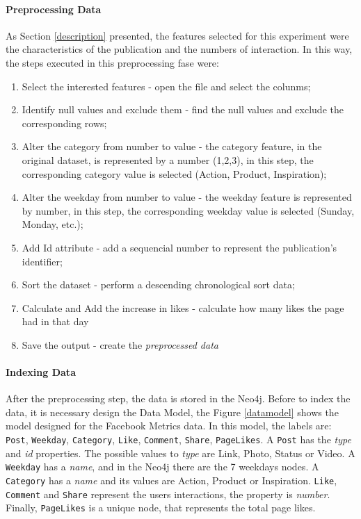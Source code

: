 \paragraph{Preprocessing Data}\label{preprocessing-data}

As Section \ref{description} presented, the features selected for this
experiment were the characteristics of the publication and the numbers
of interaction. In this way, the steps executed in this preprocessing
fase were:

\begin{enumerate}
\def\labelenumi{\arabic{enumi}.}
\tightlist
\item
  Select the interested features - open the file and select the colunms;
\item
  Identify null values and exclude them - find the null values and
  exclude the corresponding rows;
\item
  Alter the category from number to value - the category feature, in the
  original dataset, is represented by a number (1,2,3), in this step,
  the corresponding category value is selected (Action, Product,
  Inspiration);
\item
  Alter the weekday from number to value - the weekday feature is
  represented by number, in this step, the corresponding weekday value
  is selected (Sunday, Monday, etc.);
\item
  Add Id attribute - add a sequencial number to represent the
  publication's identifier;
\item
  Sort the dataset - perform a descending chronological sort data;
\item
  Calculate and Add the increase in likes - calculate how many likes the
  page had in that day
\item
  Save the output - create the \emph{preprocessed data}
\end{enumerate}

\paragraph{Indexing Data}\label{indexing-data}

After the preprocessing step, the data is stored in the Neo4j. Before to
index the data, it is necessary design the Data Model, the Figure
\ref{datamodel} shows the model designed for the Facebook Metrics data.
In this model, the labels are: \texttt{Post}, \texttt{Weekday},
\texttt{Category}, \texttt{Like}, \texttt{Comment}, \texttt{Share},
\texttt{PageLikes}. A \texttt{Post} has the \emph{type} and \emph{id}
properties. The possible values to \emph{type} are Link, Photo, Status
or Video. A \texttt{Weekday} has a \emph{name}, and in the Neo4j there
are the 7 weekdays nodes. A \texttt{Category} has a \emph{name} and its
values are Action, Product or Inspiration. \texttt{Like},
\texttt{Comment} and \texttt{Share} represent the users interactions,
the property is \emph{number}. Finally, \texttt{PageLikes} is a unique
node, that represents the total page likes.

